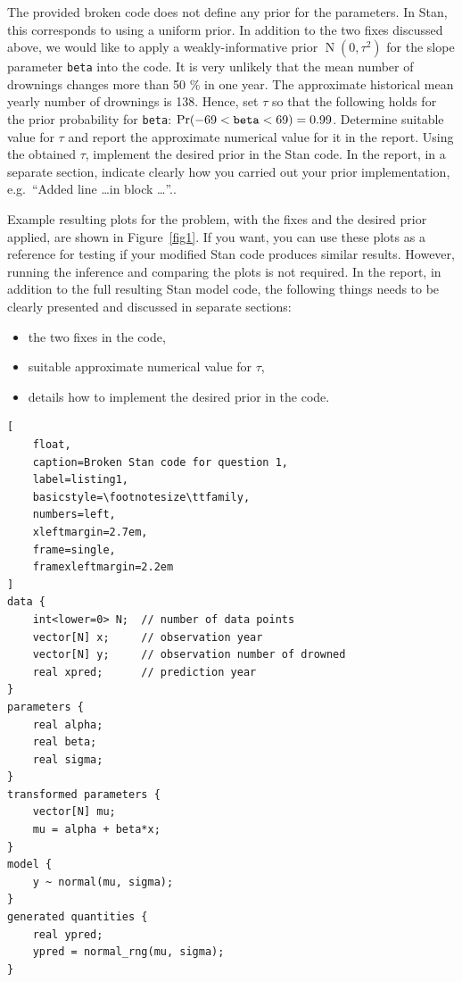 \documentclass[a4paper,11pt]{article}
\begin{document}
The provided broken code does not define any prior for the parameters. In Stan, this corresponds to using a uniform prior. In addition to the two fixes discussed above, we would like to apply a weakly-informative prior $\operatorname{N}(0, \tau^2)$ for the slope parameter {\tt beta} into the code. It is very unlikely that the mean number of drownings changes more than 50 \% in one year. The approximate historical mean yearly number of drownings is 138. Hence, set $\tau$ so that the following holds for the prior probability for {\tt beta}: $\operatorname{Pr}(-69 < \text{{\tt beta}} < 69) = 0.99$. Determine suitable value for $\tau$ and report the approximate numerical value for it in the report. Using the obtained $\tau$, implement the desired prior in the Stan code. In the report, in a separate section, indicate clearly how you carried out your prior implementation, e.g.\ ``Added line \dots in block \dots''..

Example resulting plots for the problem, with the fixes and the desired prior applied, are shown in Figure~\ref{fig1}. If you want, you can use these plots as a reference for testing if your modified Stan code produces similar results. However, running the inference and comparing the plots is not required. In the report, in addition to the full resulting Stan model code, the following things needs to be clearly presented and discussed in separate sections:
\begin{itemize}
\item the two fixes in the code,
\item suitable approximate numerical value for $\tau$,
\item details how to implement the desired prior in the code.
\end{itemize}

\begin{lstlisting}[
	float,
	caption=Broken Stan code for question 1,
	label=listing1,
	basicstyle=\footnotesize\ttfamily,
	numbers=left,
	xleftmargin=2.7em,
	frame=single,
	framexleftmargin=2.2em
]
data {
    int<lower=0> N;  // number of data points
    vector[N] x;     // observation year
    vector[N] y;     // observation number of drowned
    real xpred;      // prediction year
}
parameters {
    real alpha;
    real beta;
    real sigma;
}
transformed parameters {
    vector[N] mu;
    mu = alpha + beta*x;
}
model {
    y ~ normal(mu, sigma);
}
generated quantities {
    real ypred;
    ypred = normal_rng(mu, sigma);
}
\end{lstlisting}
\end{document}
